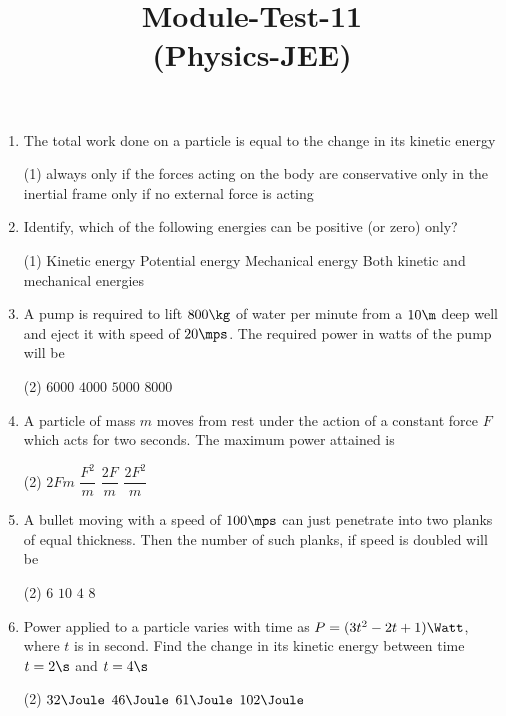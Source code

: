\documentclass{article}
\title{Module-Test-11\\(Physics-JEE)}
\begin{document}
\maketitle

\jeeSectionA
\begin{enumerate}
\item The total work done on a particle is equal to the change in its kinetic energy
\begin{tasks}(1)
	\task always\ans
	\task only if the forces acting on the body are conservative
	\task only in the inertial frame
	\task only if no external force is acting
\end{tasks}

\item Identify, which of the following energies can be positive (or zero) only?
\begin{tasks}(1)
	\task Kinetic energy\ans
	\task Potential energy
	\task Mechanical energy
	\task Both kinetic and mechanical energies
\end{tasks}

\item A pump is required to lift $800 \kg$ of water per minute from a $10 \m$ deep well and eject it with speed of $20 \mps$. The required power in watts of the pump will be
\begin{tasks}(2)
	\task $6000$
	\task $4000$\ans
	\task $5000$
	\task $8000$
\end{tasks}

\item A particle of mass $m$ moves from rest under the action of a constant force $F$ which acts for two seconds. The maximum power attained is
\begin{tasks}(2)
	\task $2Fm$
	\task $\dfrac{F^2}{m}$
	\task $\dfrac{2F}{m}$
	\task $\dfrac{2F^2}{m}$\ans
\end{tasks}

\item A bullet moving with a speed of $100 \mps$ can just penetrate into two planks of equal thickness. Then the number of such planks, if speed is doubled will be
\begin{tasks}(2)
	\task $6$
	\task $10$
	\task $4$
	\task $8$\ans
\end{tasks}

\item Power applied to a particle varies with time as $P = (3t^2 - 2t + 1) \Watt$, where $t$ is in second. Find the change in its kinetic energy between time $t = 2 \s$ and $t = 4 \s$
\begin{tasks}(2)
	\task $32\Joule$
	\task $46\Joule$\ans
	\task $61\Joule$
	\task $102\Joule$
\end{tasks}


\end{enumerate}
\end{document}
